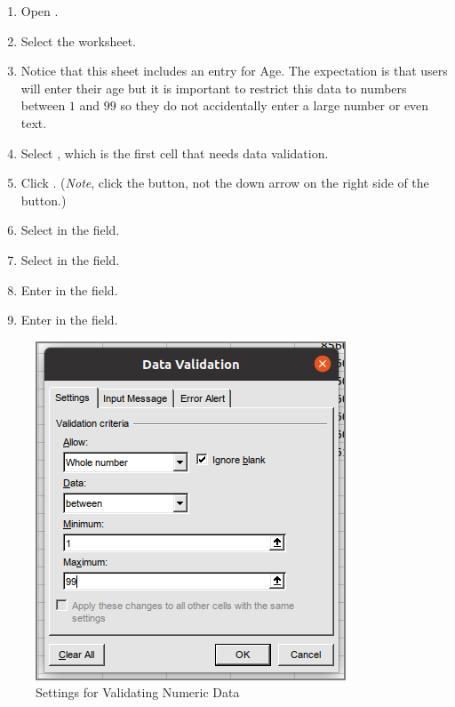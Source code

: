 \begin{enumerate}
	\item Open .
	\item Select the  worksheet.
	\item Notice that this sheet includes an entry for Age. The expectation is that users will enter their age but it is important to restrict this data to numbers between $ 1 $ and $ 99 $ so they do not accidentally enter a large number or even text.
	\item Select , which is the first cell that needs data validation. 
	\item Click . (\textit{Note}, click the button, not the down arrow on the right side of the button.)
	\item Select  in the  field.
	\item Select  in the  field.
	\item Enter  in the  field.
	\item Enter  in the  field.
\end{enumerate}

\begin{figure}[H]
	\centering
	\includegraphics[width=\maxwidth{.95\linewidth}]{gfx/ch07_fig39}
	\caption{Settings for Validating Numeric Data}
	\label{07:fig39}
\end{figure}

